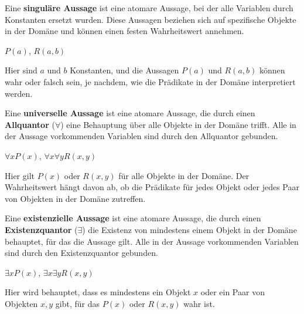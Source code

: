 \documentclass[main.tex]{subfiles}
\begin{document}
\begin{definition}
Eine \textbf{singuläre Aussage} ist eine atomare Aussage, bei der alle Variablen durch Konstanten ersetzt wurden. Diese Aussagen beziehen sich auf spezifische Objekte in der Domäne und können einen festen Wahrheitswert annehmen.

\begin{example}
    \(P(a)\), \quad \(R(a, b)\)
\end{example}

Hier sind \(a\) und \(b\) Konstanten, und die Aussagen \(P(a)\) und \(R(a, b)\) können wahr oder falsch sein, je nachdem, wie die Prädikate in der Domäne interpretiert werden.
\end{definition}

\begin{definition}
Eine \textbf{universelle Aussage} ist eine atomare Aussage, die durch einen \textbf{Allquantor} (\(\forall\)) eine Behauptung über alle Objekte in der Domäne trifft. Alle in der Aussage vorkommenden Variablen sind durch den Allquantor gebunden.

\begin{example}
    \(\forall x P(x)\), \quad \(\forall x \forall y R(x, y)\)
\end{example}

Hier gilt \(P(x)\) oder \(R(x, y)\) für alle Objekte in der Domäne. Der Wahrheitswert hängt davon ab, ob die Prädikate für jedes Objekt oder jedes Paar von Objekten in der Domäne zutreffen.
\end{definition}

\begin{definition}
Eine \textbf{existenzielle Aussage} ist eine atomare Aussage, die durch einen \textbf{Existenzquantor} (\(\exists\)) die Existenz von mindestens einem Objekt in der Domäne behauptet, für das die Aussage gilt. Alle in der Aussage vorkommenden Variablen sind durch den Existenzquantor gebunden.

\begin{example}
    \(\exists x P(x)\), \quad \(\exists x \exists y R(x, y)\)
\end{example}

Hier wird behauptet, dass es mindestens ein Objekt \(x\) oder ein Paar von Objekten \(x, y\) gibt, für das \(P(x)\) oder \(R(x, y)\) wahr ist.
\end{definition}
\end{document}
